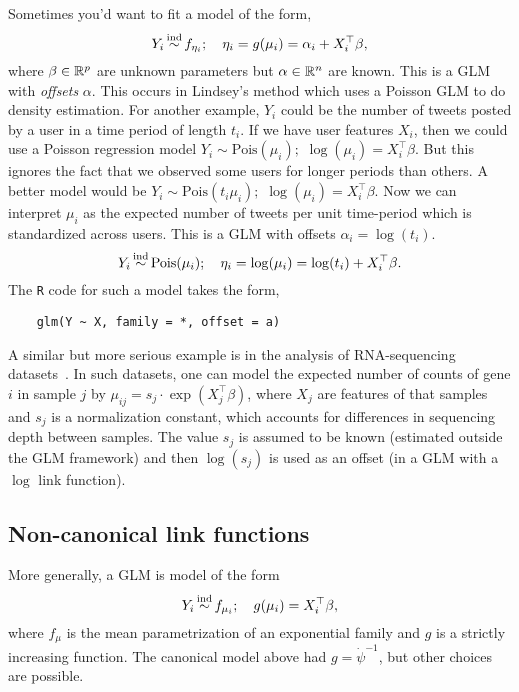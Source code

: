 Sometimes you'd want to fit a model of the form,
\[ 
    Y_i \simind f_{\eta_i}; \quad \eta_i = g(\mu_i) = \alpha_i + X_i^\top\beta,    
\]
where $\beta \in \mathbb{R}^p$ are unknown parameters but $\alpha \in \mathbb{R}^n$ are known. This is a GLM with \emph{offsets} $\alpha$. This occurs in Lindsey's method which uses a Poisson GLM to do density estimation. For another example, $Y_i$ could be the number of tweets posted by a user in a time period of length $t_i$. If we have user features $X_i$, then we could use a Poisson regression model $Y_i \sim \mathrm{Pois}(\mu_i);$ $\log(\mu_i) = X_i^\top \beta$. But this ignores the fact that we observed some users for longer periods than others. A better model would be $Y_i \sim \mathrm{Pois}(t_i\mu_i);$ $\log(\mu_i) = X_i^\top \beta$. Now we can interpret $\mu_i$ as the expected number of tweets per unit time-period which is standardized across users. This is a GLM with offsets $\alpha_i = \log(t_i)$. 
\[Y_i \simind \mathrm{Pois}(\mu_i); \quad \eta_i = \log(\mu_i) = \log(t_i) + X_i^\top\beta. \]
The \verb|R| code for such a model takes the form,
\begin{lstlisting}
    glm(Y ~ X, family = *, offset = a)
\end{lstlisting}
A similar but more serious example is in the analysis of RNA-sequencing datasets~\citet{love2014moderated}. In such datasets, one can model the expected number of counts of gene $i$ in sample $j$ by $\mu_{ij} = s_j \cdot \exp(X_j^\top \beta)$, where $X_{j}$ are features of that samples and $s_j$ is a normalization constant, which accounts for differences in sequencing depth between samples. The value $s_j$ is assumed to be known (estimated outside the GLM framework) and then $\log(s_j)$ is used as an offset (in a GLM with a $\log$ link function).



\subsection{Non-canonical link functions}

More generally, a GLM is model of the form
\[Y_i \simind f_{\mu_i}; \quad g(\mu_i) = X_i^\top \beta,\]
where $f_{\mu}$ is the mean parametrization of an exponential family and $g$ is a strictly increasing function. The canonical model above had $g = \dot{\psi}^{-1}$, but other choices are possible.


